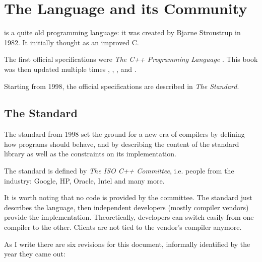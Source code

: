 \chapter{The \Cpp{} Language and its Community}

\Cpp is a quite old programming language: it was created by Bjarne Stroustrup
in 1982. It initially thought as an improved C.

The first official specifications were \emph{The C++ Programming
  Language} \cite{the-cpp-programming-language-1st}. This book was
then updated multiple times \cite{the-cpp-programming-language-2nd},
\cite{the-cpp-programming-language-3rd},
\cite{the-cpp-programming-language-se}, and
\cite{the-cpp-programming-language-4th}.

Starting from 1998, the official specifications are described in
\emph{The Standard}.

\section{The Standard}

The standard from 1998 set the ground for a new era of compilers by
defining how \cpp{} programs should behave, and by describing the
content of the standard library as well as the constraints on its
implementation.

The standard is defined by {\em The ISO C++ Committee}, i.e. people
from the industry: Google, HP, Oracle, Intel and many more.

It is worth noting that no code is provided by the committee. The
standard just describes the language, then independent developers
(mostly compiler vendors) provide the implementation. Theoretically,
developers can switch easily from one compiler to the other. Clients
are not tied to the vendor's compiler anymore.

As I write there are six revisions for this document, informally
identified by the year they came out:

